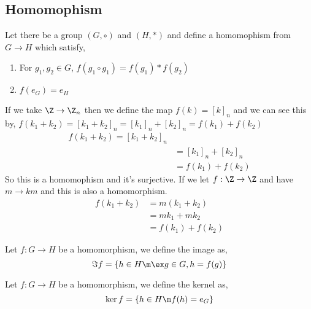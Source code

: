 
\subsection{Homomophism}

\begin{ndefi}[Homomophism]
  Let there be a group $(G, \circ)$ and $(H, *)$ and define a homomophism from $G \to H$ which satisfy,
  \begin{enumerate}
    \item For $g_1, g_2 \in G$, $f(g_1 \circ g_1) = f(g_1) * f(g_2)$
    \item $f(e_G) = e_H$
  \end{enumerate}
\end{ndefi}

If we take $\Z \to \Z_n$ then we define the map $f(k) = [k]_n$ and we can see this by, $f(k_1 + k_2) = [k_1 + k_2]_n = [k_1]_n + [k_2]_n = f(k_1) + f(k_2)$
\begin{align*}
  f(k_1 + k_2) = [k_1 + k_2]_n\\
  &= [k_1]_n + [k_2]_n\\
  &= f(k_1) + f(k_2)
\end{align*}
So this is a homomophism and it's surjective. If we let $f: \Z \to \Z$ and have $m \to km$ and this is also a homomorphism.
\begin{align*}
  f(k_1 + k_2) &= m(k_1 + k_2)\\
  &= mk_1 + mk_2\\
  &= f(k_1) + f(k_2)
\end{align*}

\begin{ndefi}[Image]
  Let $f : G \to H$ be a homomorphism, we define the image as,
  $$ \Im f = \{ h \in H \m \ex g \in G, h = f(g)\} $$
\end{ndefi}

\begin{ndefi}[Kernel]
  Let $f : G \to H$ be a homomorphism, we define the kernel as,
  $$ \ker f = \{ h \in H \m f(h) = e_G \} $$
\end{ndefi}

